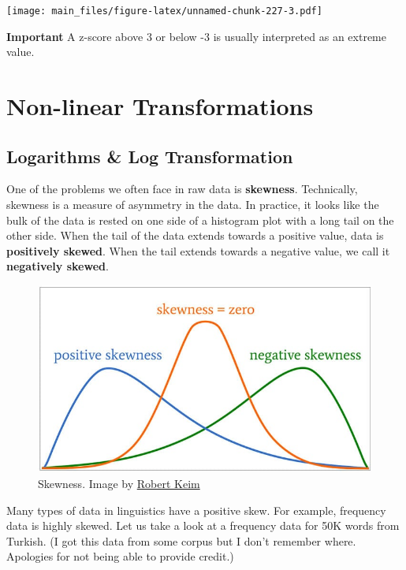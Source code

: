 \documentclass[
]{book}
\begin{document}
\texttt{[image: main\_files/figure-latex/unnamed-chunk-227-3.pdf]}

\textbf{Important} A z-score above 3 or below -3 is usually interpreted as an extreme value.

\hypertarget{non-linear-transformations}{%
\section{Non-linear Transformations}\label{non-linear-transformations}}

\hypertarget{logarithms-log-transformation}{%
\subsection{Logarithms \& Log Transformation}\label{logarithms-log-transformation}}

One of the problems we often face in raw data is \textbf{skewness}. Technically, skewness is a measure of asymmetry in the data. In practice, it looks like the bulk of the data is rested on one side of a histogram plot with a long tail on the other side. When the tail of the data extends towards a positive value, data is \textbf{positively skewed}. When the tail extends towards a negative value, we call it \textbf{negatively skewed}.

\begin{figure}
\centering
\includegraphics{./img/skewness.jpg}
\caption{\label{fig:skewness}Skewness. Image by \href{https://www.allaboutcircuits.com/technical-articles/understanding-the-normal-distribution-parametric-tests-skewness-and-kurtosis/}{Robert Keim}}
\end{figure}

Many types of data in linguistics have a positive skew. For example, frequency data is highly skewed. Let us take a look at a frequency data for 50K words from Turkish. (I got this data from some corpus but I don't remember where. Apologies for not being able to provide credit.)
\end{document}
